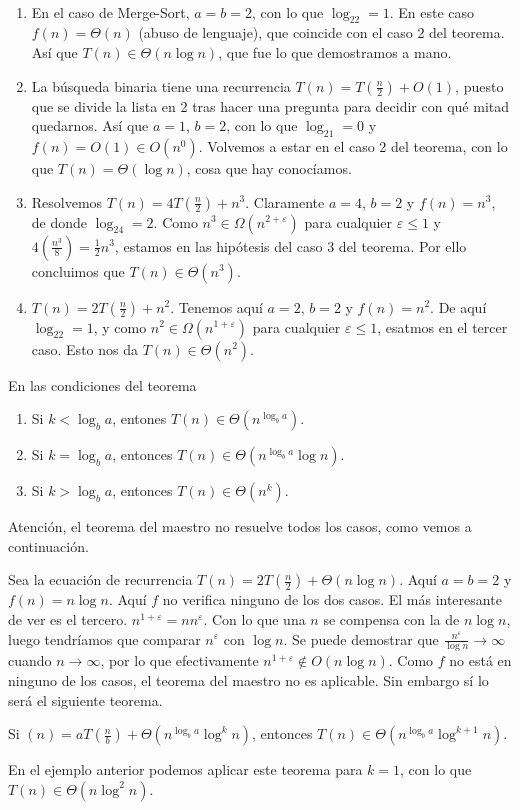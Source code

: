\documentclass[AL.tex]{subfiles}
\begin{document}
\begin{ejs}\
\begin{enumerate}
\item En el caso de Merge-Sort, $a=b=2$, con lo que $\log_22=1$. En este caso $f(n)=\Theta(n)$ (abuso de lenguaje), que coincide con el caso 2 del teorema. Así que $T(n)\in\Theta(n\log n)$, que fue lo que demostramos a mano. 

\item La búsqueda binaria tiene una recurrencia $T(n)=T(\frac{n}{2})+O(1)$, puesto que se divide la lista en 2 tras hacer una pregunta para decidir con qué mitad quedarnos. Así que $a=1$, $b=2$, con lo que $\log_21=0$ y $f(n)=O(1)\in O(n^0)$. Volvemos a estar en el caso 2 del teorema, con lo que $T(n)=\Theta(\log n)$, cosa que hay conocíamos. 

\item Resolvemos $T(n)=4T(\frac{n}{2})+n^3$. Claramente $a=4$, $b=2$ y $f(n)=n^3$, de donde $\log_24=2$. Como $n^3\in\Omega (n^{2+\varepsilon})$ para cualquier $\varepsilon\leq 1$ y $4(\frac{n^3}{8})=\frac{1}{2}n^3$, estamos en las hipótesis del caso 3 del teorema. Por ello concluimos que $T(n)\in\Theta(n^3)$. 

\item $T(n)=2T(\frac{n}{2})+n^2$. Tenemos aquí $a=2$, $b=2$ y $f(n)=n^2$. De aquí $\log_22=1$, y como $n^2\in\Omega(n^{1+\varepsilon})$ para cualquier $\varepsilon\leq 1$, esatmos en el tercer caso. Esto nos da $T(n)\in\Theta(n^2)$. 
\end{enumerate}
\end{ejs}

\begin{coro}[versión para $f(n)=\Theta(n^k)$]
En las condiciones del teorema
\begin{enumerate}
\item Si $k<\log_ba$, entones $T(n)\in\Theta(n^{\log_ba})$.
\item Si $k=\log_ba$, entonces $T(n)\in\Theta(n^{\log_ba}\log n)$.
\item Si $k>\log_ba$, entonces $T(n)\in\Theta(n^k)$. 
\end{enumerate}
\end{coro}

Atención, el teorema del maestro no resuelve todos los casos, como vemos a continuación.
\begin{ej}
Sea la ecuación de recurrencia $T(n)=2T(\frac{n}{2})+\Theta(n\log n)$. Aquí $a=b=2$ y $f(n)=n\log n$. Aquí $f$ no verifica ninguno de los dos casos. El más interesante de ver es el tercero. $n^{1+\varepsilon}=nn^{\varepsilon}$. Con lo que una $n$ se compensa con la de $n\log n$, luego tendríamos que comparar $n^{\varepsilon}$ con $\log n$. Se puede demostrar que $\frac{n^{\varepsilon}}{\log n}\to\infty$ cuando $n\to\infty$, por lo que efectivamente $n^{1+\varepsilon}\notin O(n\log n)$. Como $f$ no está en ninguno de los casos, el teorema del maestro no es aplicable. Sin embargo sí lo será el siguiente teorema.
\end{ej}

\begin{teorema}
Si $(n)=aT(\frac{n}{b})+\Theta(n^{\log_ba}\log^kn)$, entonces $T(n)\in\Theta(n^{\log_ba}\log^{k+1}n)$.
\end{teorema}

En el ejemplo anterior podemos aplicar este teorema para $k=1$, con lo que $T(n)\in\Theta(n\log^2n)$. 
\end{document}
